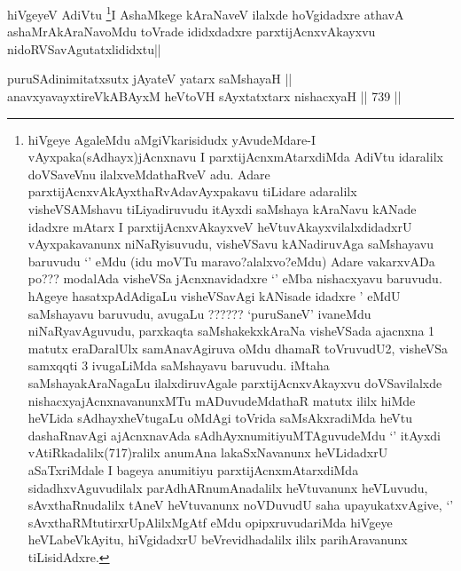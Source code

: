 \begin{artha}
hiVgeyeV AdiVtu \footnote{hiVgeye AgaleMdu aMgiVkarisidudx yAvudeMdare-I vAyxpaka(sAdhayx)jAcnxnavu I parxtijAcnxmAtarxdiMda AdiVtu idaralilx doVSaveVnu ilalxveMdathaRveV adu. Adare parxtijAcnxvAkAyxthaRvAdavAyxpakavu tiLidare adaralilx visheVSAMshavu tiLiyadiruvudu itAyxdi saMshaya kAraNavu kANade idadxre mAtarx I parxtijAcnxvAkayxveV heVtuvAkayxvilalxdidadxrU vAyxpakavanunx niNaRyisuvudu, visheVSavu kANadiruvAga saMshayavu baruvudu `\stext' eMdu (idu moVTu maravo?alalxvo?eMdu) Adare vakarxvADa po??? modalAda visheVSa jAcnxnavidadxre `\stext' eMba nishacxyavu baruvudu. hAgeye hasatxpAdAdigaLu visheVSavAgi kANisade idadxre \stext' eMdU saMshayavu baruvudu, avugaLu ?????? `puruSaneV' ivaneMdu niNaRyavAguvudu, parxkaqta saMshakekxkAraNa visheVSada ajacnxna 1 matutx eraDaralUlx samAnavAgiruva oMdu dhamaR toVruvudU2, visheVSa samxqqti 3 ivugaLiMda saMshayavu baruvudu. iMtaha saMshayakAraNagaLu ilalxdiruvAgale parxtijAcnxvAkayxvu doVSavilalxde nishacxyajAcnxnavanunxMTu mADuvudeMdathaR matutx ililx hiMde heVLida sAdhayxheVtugaLu oMdAgi toVrida saMsAkxradiMda heVtu dashaRnavAgi ajAcnxnavAda sAdhAyxnumitiyuMTAguvudeMdu `\stext' itAyxdi vAtiRkadalilx(717)ralilx anumAna lakaSxNavanunx heVLidadxrU aSaTxriMdale I bageya anumitiyu parxtijAcnxmAtarxdiMda sidadhxvAguvudilalx parAdhARnumAnadalilx heVtuvanunx heVLuvudu, sAvxthaRnudalilx tAneV heVtuvanunx noVDuvudU saha upayukatxvAgive, `\stext' sAvxthaRMtutirxrUpAlilxMgAtf \stext eMdu opipxruvudariMda hiVgeye heVLabeVkAyitu, hiVgidadxrU beVrevidhadalilx ililx parihAravanunx tiLisidAdxre.}I AshaMkege kAraNaveV ilalxde hoVgidadxre athavA ashaMrAkAraNavoMdu toVrade ididxdadxre parxtijAcnxvAkayxvu nidoRVSavAgutatxlididxtu||
\end{artha}


\begin{shl}
puruSAdinimitatxsutx jAyateV yatarx saMshayaH || \\
anavxyavayxtireVkABAyxM heVtoVH sAyxtatxtarx nishacxyaH ||  739 ||  
\end{shl}


